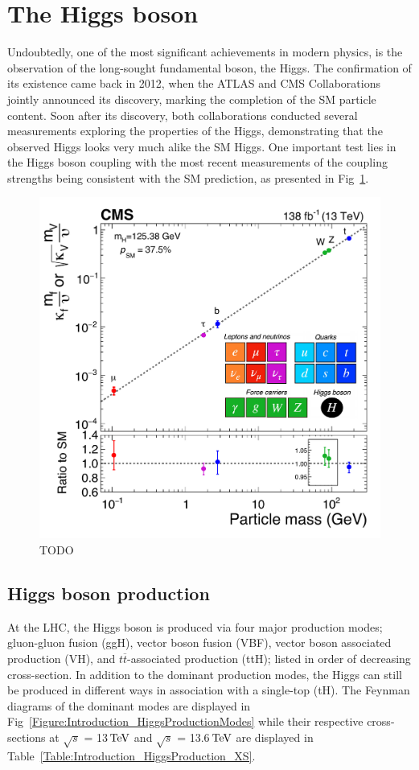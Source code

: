 \section{The Higgs boson}

Undoubtedly, one of the most significant achievements in modern physics, is the observation of the long-sought fundamental boson, the Higgs. The confirmation of its existence came back in 2012, when the ATLAS and CMS Collaborations jointly announced its discovery, marking the completion of the SM particle content. Soon after its discovery, both collaborations conducted several measurements exploring the properties of the Higgs, demonstrating that the observed Higgs looks very much alike the SM Higgs. One important test lies in the Higgs boson coupling with the most recent measurements of the coupling strengths being consistent with the SM prediction, as presented in Fig~\ref{Fig:Introduction_CMScouplings}.

\begin{figure}[h]
\centering
\includegraphics[width= .7\textwidth]{Figures/Introduction/CMS_Higgs_FermionCouplings.pdf}
\caption{TODO}\label{Fig:Introduction_CMScouplings}
\end{figure}

\subsection{Higgs boson production}

At the \ac{LHC}, the Higgs boson is produced via four major production modes; gluon-gluon fusion (ggH), vector boson fusion (VBF), vector boson associated production (VH), and $t\overline{t}$-associated production (ttH); listed in order of decreasing cross-section. In addition to the dominant production modes, the Higgs can still be produced in different ways \eg in association with a single-top (tH). The Feynman diagrams of the dominant modes are displayed in Fig~\ref{Figure:Introduction_HiggsProductionModes} while their respective cross-sections at $\sqrt{s}$ = 13$\,\text{Te\hspace{-.08em}V}$ and $\sqrt{s}$ = 13.6$\,\text{Te\hspace{-.08em}V}$ are displayed in Table~\ref{Table:Introduction_HiggsProduction_XS}. 

